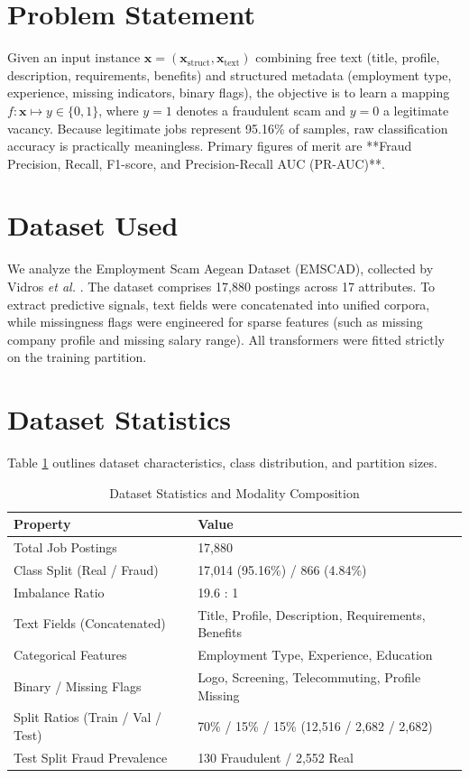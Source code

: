 \documentclass[conference,10pt]{IEEEtran}
\begin{document}
\section{Problem Statement}
Given an input instance $\mathbf{x} = (\mathbf{x}_{\text{struct}}, \mathbf{x}_{\text{text}})$ combining free text (title, profile, description, requirements, benefits) and structured metadata (employment type, experience, missing indicators, binary flags), the objective is to learn a mapping $f: \mathbf{x} \mapsto y \in \{0, 1\}$, where $y=1$ denotes a fraudulent scam and $y=0$ a legitimate vacancy. Because legitimate jobs represent 95.16\% of samples, raw classification accuracy is practically meaningless. Primary figures of merit are **Fraud Precision, Recall, F1-score, and Precision-Recall AUC (PR-AUC)**.

\section{Dataset Used}
We analyze the Employment Scam Aegean Dataset (EMSCAD), collected by Vidros \textit{et al.} \cite{vidros2017}. The dataset comprises 17,880 postings across 17 attributes. To extract predictive signals, text fields were concatenated into unified corpora, while missingness flags were engineered for sparse features (such as missing company profile and missing salary range). All transformers were fitted strictly on the training partition.

\section{Dataset Statistics}
Table \ref{tab:dataset} outlines dataset characteristics, class distribution, and partition sizes.

\begin{table}[htbp]
\caption{Dataset Statistics and Modality Composition}
\label{tab:dataset}
\centering
\begin{tabular}{ll}
\toprule
\textbf{Property} & \textbf{Value} \\
\midrule
Total Job Postings & 17,880 \\
Class Split (Real / Fraud) & 17,014 (95.16\%) / 866 (4.84\%) \\
Imbalance Ratio & 19.6 : 1 \\
Text Fields (Concatenated) & Title, Profile, Description, Requirements, Benefits \\
Categorical Features & Employment Type, Experience, Education \\
Binary / Missing Flags & Logo, Screening, Telecommuting, Profile Missing \\
Split Ratios (Train / Val / Test) & 70\% / 15\% / 15\% (12,516 / 2,682 / 2,682) \\
Test Split Fraud Prevalence & 130 Fraudulent / 2,552 Real \\
\bottomrule
\end{tabular}
\end{table}
\end{document}
